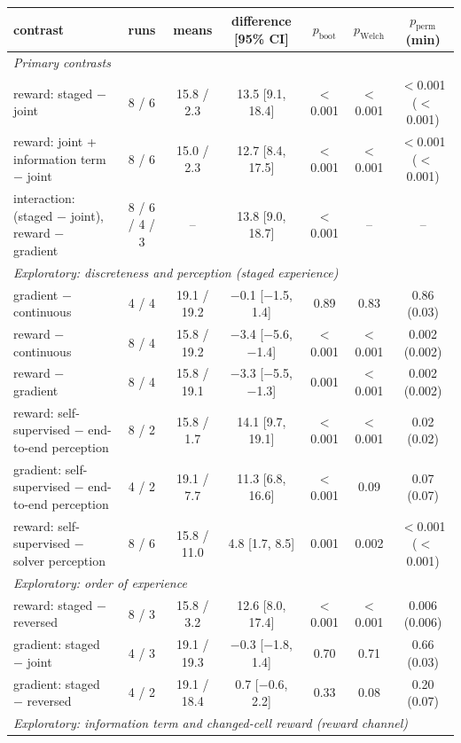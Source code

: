 \begin{tabular}{lcccccc}\toprule
contrast & runs & means & difference [95\% CI] & $p_\mathrm{boot}$ & $p_\mathrm{Welch}$ & $p_\mathrm{perm}$ (min) \\ \midrule
\multicolumn{7}{l}{\emph{Primary contrasts}} \\
\quad reward: staged $-$ joint & 8 / 6 & 15.8 / 2.3 & 13.5 [9.1, 18.4] & $<$0.001 & $<$0.001 & $<$0.001 ($<$0.001) \\
\quad reward: joint + information term $-$ joint & 8 / 6 & 15.0 / 2.3 & 12.7 [8.4, 17.5] & $<$0.001 & $<$0.001 & $<$0.001 ($<$0.001) \\
\quad interaction: (staged $-$ joint), reward $-$ gradient & 8 / 6 / 4 / 3 & -- & 13.8 [9.0, 18.7] & $<$0.001 & -- & -- \\
\multicolumn{7}{l}{\emph{Exploratory: discreteness and perception (staged experience)}} \\
\quad gradient $-$ continuous & 4 / 4 & 19.1 / 19.2 & $-$0.1 [$-$1.5, 1.4] & 0.89 & 0.83 & 0.86 (0.03) \\
\quad reward $-$ continuous & 8 / 4 & 15.8 / 19.2 & $-$3.4 [$-$5.6, $-$1.4] & $<$0.001 & $<$0.001 & 0.002 (0.002) \\
\quad reward $-$ gradient & 8 / 4 & 15.8 / 19.1 & $-$3.3 [$-$5.5, $-$1.3] & 0.001 & $<$0.001 & 0.002 (0.002) \\
\quad reward: self-supervised $-$ end-to-end perception & 8 / 2 & 15.8 / 1.7 & 14.1 [9.7, 19.1] & $<$0.001 & $<$0.001 & 0.02 (0.02) \\
\quad gradient: self-supervised $-$ end-to-end perception & 4 / 2 & 19.1 / 7.7 & 11.3 [6.8, 16.6] & $<$0.001 & 0.09 & 0.07 (0.07) \\
\quad reward: self-supervised $-$ solver perception & 8 / 6 & 15.8 / 11.0 & 4.8 [1.7, 8.5] & 0.001 & 0.002 & $<$0.001 ($<$0.001) \\
\multicolumn{7}{l}{\emph{Exploratory: order of experience}} \\
\quad reward: staged $-$ reversed & 8 / 3 & 15.8 / 3.2 & 12.6 [8.0, 17.4] & $<$0.001 & $<$0.001 & 0.006 (0.006) \\
\quad gradient: staged $-$ joint & 4 / 3 & 19.1 / 19.3 & $-$0.3 [$-$1.8, 1.4] & 0.70 & 0.71 & 0.66 (0.03) \\
\quad gradient: staged $-$ reversed & 4 / 2 & 19.1 / 18.4 & 0.7 [$-$0.6, 2.2] & 0.33 & 0.08 & 0.20 (0.07) \\
\multicolumn{7}{l}{\emph{Exploratory: information term and changed-cell reward (reward channel)}} \\

\end{tabular}
